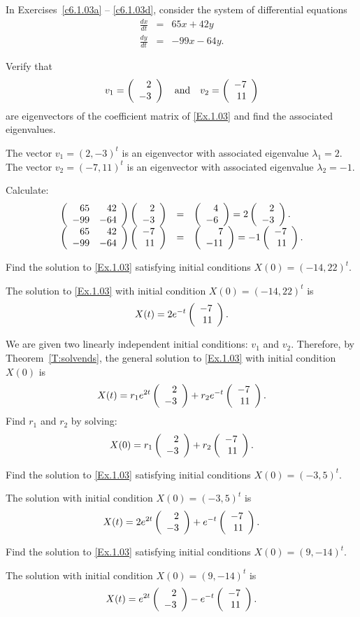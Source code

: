 \documentclass{ximera}
\begin{document}
\noindent In Exercises~\ref{c6.1.03a} -- \ref{c6.1.03d}, consider the system of
differential equations
\begin{equation} \label{Ex.1.03}
\begin{array}{rcr}
\frac{dx}{dt}  & = & 65x+42y \\
\frac{dy}{dt}  & = & -99x-64y.
\end{array}
\end{equation}
\begin{exercise} \label{c6.1.03a}
Verify that
\[
v_1 = \left(\begin{array}{r} 2 \\ -3\end{array}\right) \quad\mbox{and}\quad v_2 = \left(\begin{array}{r} -7 \\ 11\end{array}\right)
\]
are eigenvectors of the coefficient matrix of \eqref{Ex.1.03} and find
the associated eigenvalues.

\begin{solution}

\ans The vector $v_1 = (2,-3)^t$ is an eigenvector with associated
eigenvalue $\lambda_1 = 2$.  The vector $v_2 = (-7,11)^t$ is an
eigenvector with associated eigenvalue $\lambda_2 = -1$.

\soln Calculate:
\[
\begin{array}{rcl}
\left(\begin{array}{rr} 65 & 42\\ -99 &-64\end{array}\right)\left(\begin{array}{r} 2 \\ -3\end{array}\right) & = & \left(\begin{array}{r} 4 \\ -6\end{array}\right) =
2\left(\begin{array}{r} 2 \\ -3\end{array}\right). \\
\left(\begin{array}{rr} 65 & 42\\ -99 &-64\end{array}\right)\left(\begin{array}{r} -7 \\ 11\end{array}\right) & = & \left(\begin{array}{r} 7 \\ -11\end{array}\right) =
-1\left(\begin{array}{r} -7 \\ 11\end{array}\right).
\end{array}
\]

\end{solution}
\end{exercise}
\begin{exercise} \label{c6.1.03b}
Find the solution to \eqref{Ex.1.03} satisfying initial conditions $X(0) =
(-14,22)^t$.

\begin{solution}
\ans The solution to \eqref{Ex.1.03} with initial
condition $X(0) = (-14,22)^t$ is
\[
X(t) = 2e^{-t}\left(\begin{array}{r} -7 \\ 11\end{array}\right).
\]

\soln We are given two linearly independent initial conditions: $v_1$
and $v_2$.  Therefore, by Theorem~\ref{T:solvends}, 
the general solution to \eqref{Ex.1.03} with initial condition $X(0)$ is
\[
X(t) = r_1e^{2t}\left(\begin{array}{r} 2 \\ -3\end{array}\right) + r_2e^{-t}\left(\begin{array}{r} -7 \\ 11\end{array}\right).
\]
Find $r_1$ and $r_2$ by solving:
\begin{equation}  \label{c6.1.03eq}
X(0) = r_1\left(\begin{array}{r} 2 \\ -3\end{array}\right) + r_2\left(\begin{array}{r} -7 \\ 11\end{array}\right).
\end{equation}

\end{solution}
\end{exercise}
\begin{exercise} \label{c6.1.03c}
Find the solution to \eqref{Ex.1.03} satisfying initial conditions $X(0) =
(-3,5)^t$.

\begin{solution}
The solution with initial condition $X(0) = (-3,5)^t$ is
\[
X(t) = 2e^{2t}\left(\begin{array}{r} 2 \\ -3\end{array}\right) + e^{-t}\left(\begin{array}{r} -7 \\ 11\end{array}\right).
\]

\end{solution}
\end{exercise}
\begin{exercise} \label{c6.1.03d}
Find the solution to \eqref{Ex.1.03} satisfying initial conditions $X(0) =
(9,-14)^t$.

\begin{solution}
The solution with initial condition  $X(0) = (9,-14)^t$ is
\[
X(t) = e^{2t}\left(\begin{array}{r} 2 \\ -3\end{array}\right) - e^{-t}\left(\begin{array}{r} -7 \\ 11\end{array}\right).
\]




\end{solution}
\end{exercise}
\end{document}
